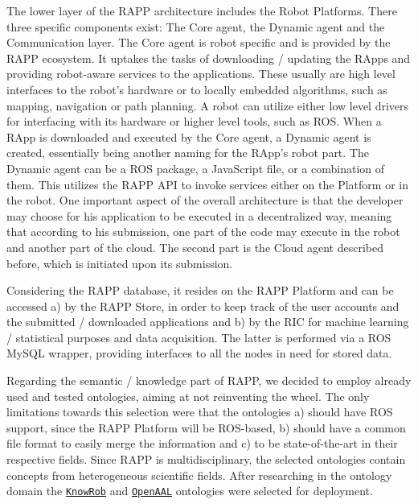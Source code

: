 The lower layer of the R\-A\-P\-P architecture includes the Robot Platforms. There three specific components exist\-: The Core agent, the Dynamic agent and the Communication layer. The Core agent is robot specific and is provided by the R\-A\-P\-P ecosystem. It uptakes the tasks of downloading / updating the R\-Apps and providing robot-\/aware services to the applications. These usually are high level interfaces to the robot’s hardware or to locally embedded algorithms, such as mapping, navigation or path planning. A robot can utilize either low level drivers for interfacing with its hardware or higher level tools, such as R\-O\-S. When a R\-App is downloaded and executed by the Core agent, a Dynamic agent is created, essentially being another naming for the R\-App’s robot part. The Dynamic agent can be a R\-O\-S package, a Java\-Script file, or a combination of them. This utilizes the R\-A\-P\-P A\-P\-I to invoke services either on the Platform or in the robot. One important aspect of the overall architecture is that the developer may choose for his application to be executed in a decentralized way, meaning that according to his submission, one part of the code may execute in the robot and another part of the cloud. The second part is the Cloud agent described before, which is initiated upon its submission.

Considering the R\-A\-P\-P database, it resides on the R\-A\-P\-P Platform and can be accessed a) by the R\-A\-P\-P Store, in order to keep track of the user accounts and the submitted / downloaded applications and b) by the R\-I\-C for machine learning / statistical purposes and data acquisition. The latter is performed via a R\-O\-S My\-S\-Q\-L wrapper, providing interfaces to all the nodes in need for stored data.

Regarding the semantic / knowledge part of R\-A\-P\-P, we decided to employ already used and tested ontologies, aiming at not reinventing the wheel. The only limitations towards this selection were that the ontologies a) should have R\-O\-S support, since the R\-A\-P\-P Platform will be R\-O\-S-\/based, b) should have a common file format to easily merge the information and c) to be state-\/of-\/the-\/art in their respective fields. Since R\-A\-P\-P is multidisciplinary, the selected ontologies contain concepts from heterogeneous scientific fields. After researching in the ontology domain the \href{http://www.knowrob.org/}{\tt Know\-Rob} and \href{http://openaal.org/}{\tt Open\-A\-A\-L} ontologies were selected for deployment.

